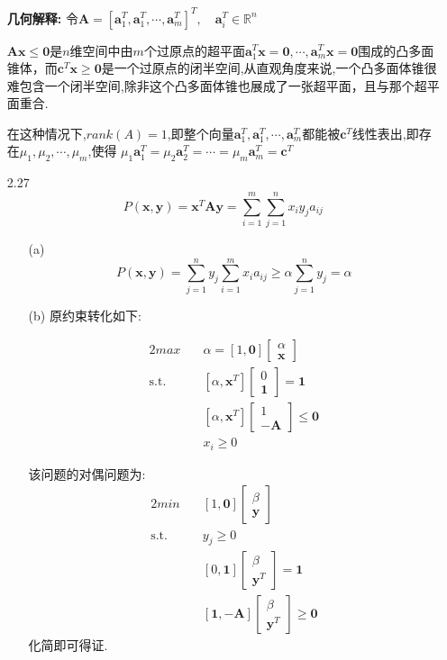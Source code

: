 \documentclass[UTF8]{ctexart}
\begin{document}
\begin{enumerate}
\textbf{几何解释:}
令$\bm{A}=[\bm{a}_1^T,\bm{a}_1^T,\cdots,\bm{a}_m^T]^T,\quad\bm{a}_i^T \in \mathbb{R}^n$

$\bm{A}\bm{x}\leq\bm{0}$是$n$维空间中由$m$个过原点的超平面$\bm{a}_1^T\bm{x}=\bm{0},\cdots,\bm{a}_m^T\bm{x}=\bm{0}$围成的凸多面锥体，而$\bm{c}^T\bm{x}\geq \bm{0}$是一个过原点的闭半空间,从直观角度来说,一个凸多面体锥很难包含一个闭半空间,除非这个凸多面体锥也展成了一张超平面，且与那个超平面重合.

在这种情况下,$rank(A)=1$,即整个向量$\bm{a}_1^T,\bm{a}_1^T,\cdots,\bm{a}_m^T$都能被$\bm{c}^T$线性表出,即存在$\mu_1,\mu_2,\cdots,\mu_m$,使得
$\mu_1\bm{a}_1^T=\mu_2\bm{a}_2^T=\cdots=\mu_m\bm{a}_m^T=\bm{c}^T$

\clearpage
\item[2.27]
\[P(\bm{x},\bm{y})=\bm{x}^T\bm{A}\bm{y}=\sum^{m}_{i=1}\sum^{n}_{j=1}x_iy_ja_{ij}\]
\begin{enumerate}
\item[(a)]
\[P(\bm{x},\bm{y})=\sum^{n}_{j=1}y_j\sum^{m}_{i=1}x_ia_{ij}\geq \alpha\sum^{n}_{j=1}y_j=\alpha\]

\item[(b)]
原约束转化如下:

\begin{alignat}{2}
max \quad & \alpha=[1,\bm{0}]\begin{bmatrix}
   	\alpha\\
    \bm{x}
\end{bmatrix} \nonumber\\
\mbox{s.t.}\quad &
[\alpha,\bm{x}^T]\begin{bmatrix}
   	0\\
    \bm{1}\end{bmatrix}=\bm{1}\nonumber\\
&[\alpha,\bm{x}^T]\begin{bmatrix}
   	1\\
    -\bm{A}\end{bmatrix}\leq  \bm{0}\nonumber\\
& x_i\geq 0
\end{alignat}

该问题的对偶问题为:
\begin{alignat}{2}
min \quad & [1,\bm{0}]\begin{bmatrix}
    	\beta\\
    \bm{y}
\end{bmatrix} \nonumber\\
\mbox{s.t.}\quad &
y_j\geq 0  \nonumber\\
&[0,\bm{1}]\begin{bmatrix}
   	\beta\\
    \bm{y}^T
\end{bmatrix}=\bm{1}\nonumber\\
& [\bm{1},-\bm{A}]\begin{bmatrix}
   	\beta\\
    \bm{y}^T\end{bmatrix}\geq \bm{0}
\end{alignat}
化简即可得证.


\end{enumerate}
\end{enumerate}
\end{document}
